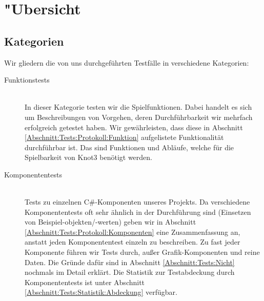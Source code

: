%



\section{{"U}bersicht}
\label{Abschnitt:Tests:Uebersicht}



\subsection{Kategorien}
\label{Abschnitt:Tests:Uebersicht:Kategorien}

Wir gliedern die von uns durchgeführten Testfälle in verschiedene Kategorien:\\


\begin{description} %


	\item[Funktionstests] \hfill
	\\
	
	In dieser Kategorie testen wir die Spielfunktionen. Dabei handelt es sich um Beschreibungen von Vorgehen, deren Durchführbarkeit wir mehrfach erfolgreich getestet haben. Wir gewährleisten, dass diese in Abschnitt \ref{Abschnitt:Tests:Protokoll:Funktion} aufgelistete Funktionalität durchführbar ist. Das sind Funktionen und Abläufe, welche für die Spielbarkeit von Knot3 benötigt werden.\\
	  
	
	\item[Komponententests] \hfill
	\\
	
	Tests zu einzelnen C\#-Komponenten unseres Projekts. Da verschiedene Komponententests oft sehr ähnlich in der Durchführung sind (Einsetzen von Beispiel-objekten/-werten) geben wir in Abschnitt \ref{Abschnitt:Tests:Protokoll:Komponenten} eine Zusammenfassung an, anstatt jeden Komponententest einzeln zu beschreiben.
	Zu fast jeder Komponente führen wir Tests durch, außer Grafik-Komponenten und reine Daten. Die Gründe dafür sind in Abschnitt \ref{Abschnitt:Tests:Nicht} nochmals im Detail erklärt. Die Statistik zur Testabdeckung durch Komponententests ist unter Abschnitt \ref{Abschnitt:Tests:Statistik:Abdeckung} verfügbar.\\



\end{description}
